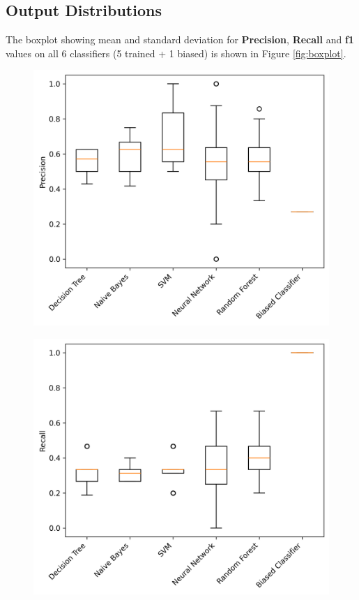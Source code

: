 \documentclass{article}
\newcommand\templateInstruction[1]{
\hl{#1}
}
\begin{document}
\subsection{Output Distributions}
The boxplot showing mean and standard deviation for \textbf{Precision}, \textbf{Recall} and \textbf{f1} values on all 6 classifiers (5 trained + 1 biased) is shown in Figure \ref{fig:boxplot}.  

\begin{figure}
	\centering
	\begin{minipage}{0.45\linewidth}
	     \includegraphics[width=\linewidth]{precision.png}
	      \label{fig:precision}
	\end{minipage}
	\begin{minipage}{0.45\linewidth}
	    \includegraphics[width=\linewidth]{recall.png}

\end{minipage}
\end{figure}
\end{document}
